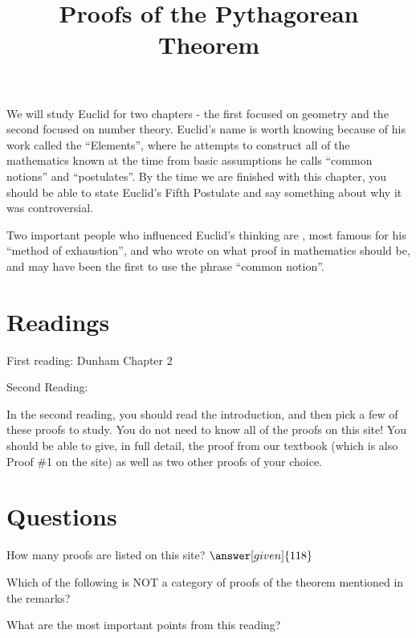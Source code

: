 \documentclass[nooutcomes]{ximera}
\title{Proofs of the Pythagorean Theorem}
\begin{document}
\begin{abstract}
    
\end{abstract}
\maketitle


We will study Euclid for two chapters - the first focused on geometry and the second focused on number theory.  Euclid's name is worth knowing because of his work called the ``Elements'', where he attempts to construct all of the mathematics known at the time from basic assumptions he calls ``common notions'' and ``postulates''.  By the time we are finished with this chapter, you should be able to state Euclid's Fifth Postulate and say something about why it was controversial.  

Two important people who influenced Euclid's thinking are , most famous for his ``method of exhaustion'', and  who wrote on what proof in mathematics should be, and may have been the first to use the phrase ``common notion''.


\section{Readings}
First reading: Dunham Chapter 2

Second Reading: 
  

In the second reading, you should read the introduction, and then pick a few of these proofs to study.  You do not need to know all of the proofs on this site!  You should be able to give, in full detail, the proof from our textbook (which is also Proof \#1 on the site) as well as two other proofs of your choice.


\section{Questions}

\begin{question}
How many proofs are listed on this site?
$\answer[given]{118}$
\end{question}

\begin{question}
Which of the following is NOT a category of proofs of the theorem mentioned in the remarks?
\begin{multipleChoice}
\end{multipleChoice}
\end{question}


\begin{question}
What are the most important points from this reading?
\begin{freeResponse}
\end{freeResponse}

\end{question}
\end{document}
